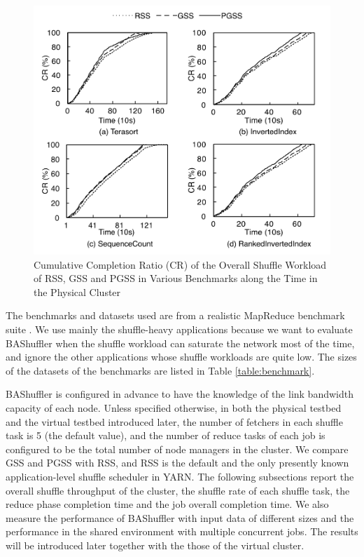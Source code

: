\documentclass[10pt,journal,compsoc]{IEEEtran}
\begin{document}
\begin{figure}
\centering
\includegraphics[width=1\columnwidth]{figure5}
\caption{Cumulative Completion Ratio (CR) of the Overall Shuffle Workload of RSS, GSS and PGSS in Various Benchmarks along the Time
in the Physical Cluster} 
\label{fig:new_completion_ratio}
\end{figure}


The benchmarks and datasets used are from a realistic MapReduce benchmark suite \cite{ahmad2012puma}. 
We use mainly the shuffle-heavy applications because we want to evaluate  BAShuffler when the shuffle workload can saturate the
network most of the time,
and ignore the other applications whose shuffle workloads are quite
low. %
The sizes of the datasets of the benchmarks are listed in Table \ref{table:benchmark}.

BAShuffler is configured in advance to have the knowledge of
the link bandwidth capacity of each node.
Unless specified otherwise, %
in both the physical testbed and the virtual testbed introduced later, 
the number of fetchers in each shuffle task is 5 (the default value), 
and the number of reduce tasks of each job is configured to
be the total number of node managers in the cluster.
We compare GSS and PGSS with RSS, and RSS is the default and the only
presently known application-level shuffle scheduler in YARN. 
The following subsections report the overall shuffle throughput of
the cluster, the shuffle rate of each shuffle task, the reduce phase
completion time and the job overall completion time.
We also measure the performance of BAShuffler with input data of
different sizes
and the performance in the shared environment with multiple concurrent jobs. 
The results will be introduced later together with the those of the virtual cluster. 
\end{document}
